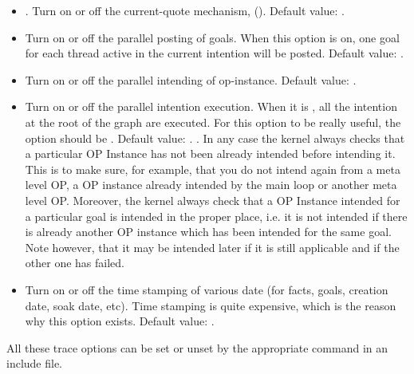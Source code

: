 \begin{itemize}

\item {}. Turn on or off the current-quote
mechanism, (). Default value: .

\item {} Turn on or off the parallel posting of
goals. When this option is on, one goal for each thread active in the
current intention will be posted. Default value: .

\item {} Turn on or off the parallel intending
of op-instance. Default value: .

\item {} Turn on or off the parallel
intention execution. When it is , all the intention at the root of the
graph are executed. For this option to be really useful, the   option should be . Default value: .
. In any case the kernel always checks that a particular
OP Instance has not been already intended before intending it. This is to make
sure, for example, that you do not intend again from a meta level OP, a OP
instance already intended by the main loop or another meta level OP. Moreover,
the kernel always check that a OP Instance intended for a particular goal is
intended in the proper place, i.e. it is not intended if there is already
another OP instance which has been intended for the same goal. Note however,
that it may be intended later if it is still applicable and if the other one
has failed.

\item {} Turn on or off the time stamping of
various date (for facts, goals, creation date, soak date, etc). Time stamping
is quite expensive, which is the reason why this option exists.  Default value:
.

\end{itemize}

All these trace options can be set or unset by the appropriate command in
an include file.

